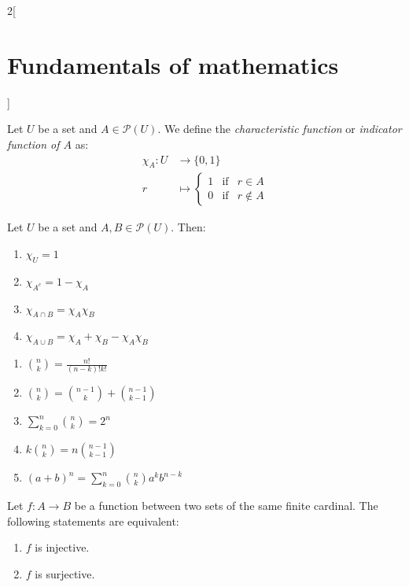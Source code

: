 \documentclass[../../../main.tex]{subfiles}
\begin{document}
\begin{multicols}{2}[\section{Fundamentals of mathematics}]
\begin{prop}
    \end{prop}
    \begin{definition}
        Let $U$ be a set and $A\in\mathcal{P}(U)$. We define the \textit{characteristic function} or \textit{indicator function of $A$} as:
        \begin{align*}
            \chi_A:U & \longrightarrow\{0,1\} \\
            r        & \longmapsto \left\{
            \begin{array}{rcl}
                1 & \text{if} & r\in A    \\
                0 & \text{if} & r\notin A
            \end{array}\right.
        \end{align*}
    \end{definition}
    \begin{prop}
        Let $U$ be a set and $A,B\in\mathcal{P}(U)$. Then:
        \begin{enumerate}
            \item $\chi_U=1$
            \item $\chi_{A^c}=1-\chi_A$
            \item $\chi_{A\cap B}=\chi_A\chi_B$
            \item $\chi_{A\cup B}=\chi_A+\chi_B-\chi_A\chi_B$
        \end{enumerate}
    \end{prop}
    \begin{prop}\hfill
        \begin{enumerate}
            \item $\binom{n}{k}=\frac{n!}{(n-k)!k!}$
            \item $\binom{n}{k}=\binom{n-1}{k}+\binom{n-1}{k-1}$
            \item $\sum_{k=0}^n\binom{n}{k}=2^n$
            \item $k\binom{n}{k}=n\binom{n-1}{k-1}$
            \item $(a+b)^n=\sum_{k=0}^n\binom{n}{k}a^kb^{n-k}$
        \end{enumerate}
    \end{prop}
    \begin{prop}
        Let $f:A\rightarrow B$ be a function between two sets of the same finite cardinal. The following statements are equivalent:
        \begin{enumerate}
            \item $f$ is injective.
            \item $f$ is surjective.

\end{enumerate}
\end{prop}
\end{multicols}
\end{document}
